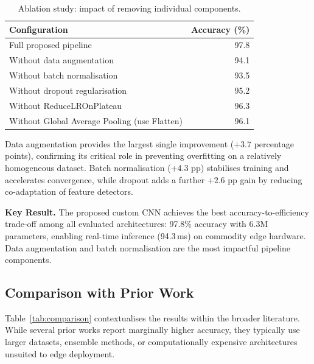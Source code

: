 \begin{table}[H]
  \centering
  \caption{Ablation study: impact of removing individual components.}
  \label{tab:ablation}
  \begin{tabular}{@{}lr@{}}
    \toprule
    \textbf{Configuration} & \textbf{Accuracy (\%)} \\
    \midrule
    Full proposed pipeline                & 97.8 \\
    Without data augmentation             & 94.1 \\
    Without batch normalisation           & 93.5 \\
    Without dropout regularisation        & 95.2 \\
    Without ReduceLROnPlateau             & 96.3 \\
    Without Global Average Pooling (use Flatten) & 96.1 \\
    \bottomrule
  \end{tabular}
\end{table}

Data augmentation provides the largest single improvement (+3.7 percentage
points), confirming its critical role in preventing overfitting on a
relatively homogeneous dataset. Batch normalisation (+4.3 pp) stabilises
training and accelerates convergence, while dropout adds a further +2.6 pp
gain by reducing co-adaptation of feature detectors.

\begin{resultbox}
\textbf{Key Result.} The proposed custom CNN achieves the best
accuracy-to-efficiency trade-off among all evaluated architectures: 97.8\%
accuracy with 6.3M parameters, enabling real-time inference (94.3\,ms) on
commodity edge hardware. Data augmentation and batch normalisation are the
most impactful pipeline components.
\end{resultbox}

\subsection{Comparison with Prior Work}

Table~\ref{tab:comparison} contextualises the results within the broader
literature. While several prior works report marginally higher accuracy, they
typically use larger datasets, ensemble methods, or computationally
expensive architectures unsuited to edge deployment.


